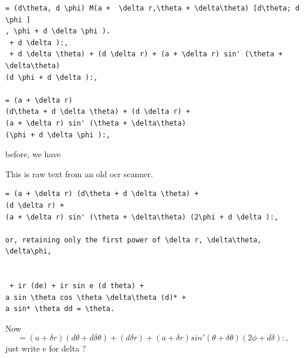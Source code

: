 \begin{verbatim}
= (d\theta, d \phi) M(a +  \delta r,\theta + \delta\theta) [d\theta; d \phi ]
, \phi + d \delta \phi ).
 + d \delta ):,
 + d \delta \theta) + (d \delta r) + (a + \delta r) sin' (\theta + \delta\theta)
(d \phi + d \delta ):,

= (a + \delta r)
(d\theta + d \delta \theta) + (d \delta r) +
(a + \delta r) sin' (\theta + \delta\theta)
(\phi + d \delta \phi ):,
\end{verbatim}
before, we have


This is raw text from an old ocr scanner.
\begin{verbatim}
= (a + \delta r) (d\theta + d \delta \theta) +
(d \delta r) +
(a + \delta r) sin' (\theta + \delta\theta) (2\phi + d \delta ):,

or, retaining only the first power of \delta r, \delta\theta, \delta\phi,


 + ir (de) + ir sin e (d theta) +
a sin \theta cos \theta \delta\theta (d)* +
a sin* \theta dd = \theta.
\end{verbatim}
Now
\[
= (a + \delta r) (d\theta +
d \delta \theta) + (d \delta r) +
(a + \delta r) sin' (\theta + \delta\theta) (2\phi + d \delta ):,
\]
just write e for delta ?
